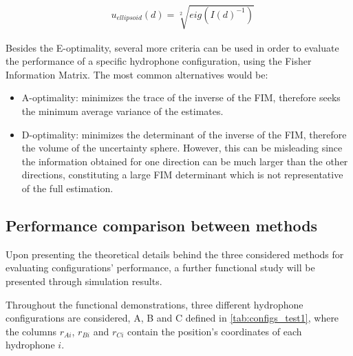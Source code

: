 \begin{eqnarray}
	& u_{ellipsoid}(d) = \sqrt[2]{eig(I(d)^{-1})}
	\label{eq:det-ellip}
\end{eqnarray}

Besides the E-optimality, several more criteria can be used in order to evaluate the performance of a specific hydrophone configuration, using the Fisher Information Matrix. The most common alternatives would be:
\begin{itemize}
	\item A-optimality: minimizes the trace of the inverse of the FIM, therefore seeks the minimum average variance of the estimates.
	\item D-optimality: minimizes the determinant of the inverse of the FIM, therefore the volume of the uncertainty sphere. However, this can be misleading since the information obtained for one direction can be much larger than the other directions, constituting a large FIM determinant which is not representative of the full estimation.
\end{itemize}


\subsection{Performance comparison between methods} \label{subsec:perform-compar-meth}

Upon presenting the theoretical details behind the three considered methods for evaluating configurations' performance, a further functional study will be presented through simulation results. 

Throughout the functional demonstrations, three different hydrophone configurations are considered, A, B and C defined in \ref{tab:configs_test1}, where the columns $r_{Ai}$, $r_{Bi}$ and $r_{Ci}$ contain the position's coordinates of each hydrophone $i$.

